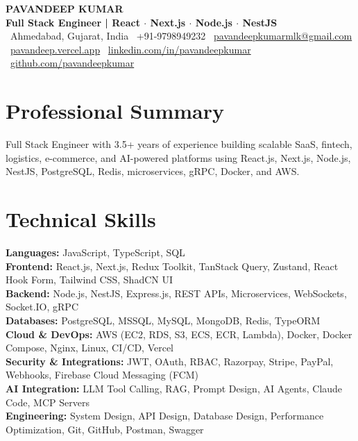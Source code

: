 \documentclass[letterpaper,10pt]{article}
\begin{document}

\begin{center}
    {\fontsize{22}{26}\selectfont\textbf{PAVANDEEP KUMAR}}\\[2pt]
    \textbf{Full Stack Engineer | React $\cdot$ Next.js $\cdot$ Node.js $\cdot$ NestJS}\\[2pt]

    \faMapMarker*\ Ahmedabad, Gujarat, India \quad
    \faPhone*\ +91-9798949232 \quad
    \faEnvelope\ \href{mailto:pavandeepkumarmlk@gmail.com}{pavandeepkumarmlk@gmail.com}\\[1pt]

    \faGlobe\ \href{https://pavandeep.vercel.app/}{pavandeep.vercel.app} \quad
    \faLinkedin\ \href{https://www.linkedin.com/in/pavandeepkumar/}{linkedin.com/in/pavandeepkumar} \quad
    \faGithub\ \href{https://github.com/pavandeepkumar}{github.com/pavandeepkumar}
\end{center}


\section{Professional Summary}

Full Stack Engineer with 3.5+ years of experience building scalable SaaS, fintech, logistics, e-commerce, and AI-powered platforms using React.js, Next.js, Node.js, NestJS, PostgreSQL, Redis, microservices, gRPC, Docker, and AWS.


\section{Technical Skills}

\textbf{Languages:} JavaScript, TypeScript, SQL\\[1pt]
\textbf{Frontend:} React.js, Next.js, Redux Toolkit, TanStack Query, Zustand, React Hook Form, Tailwind CSS, ShadCN UI\\[1pt]
\textbf{Backend:} Node.js, NestJS, Express.js, REST APIs, Microservices, WebSockets, Socket.IO, gRPC\\[1pt]
\textbf{Databases:} PostgreSQL, MSSQL, MySQL, MongoDB, Redis, TypeORM\\[1pt]
\textbf{Cloud \& DevOps:} AWS (EC2, RDS, S3, ECS, ECR, Lambda), Docker, Docker Compose, Nginx, Linux, CI/CD, Vercel\\[1pt]
\textbf{Security \& Integrations:} JWT, OAuth, RBAC, Razorpay, Stripe, PayPal, Webhooks, Firebase Cloud Messaging (FCM)\\[1pt]
\textbf{AI Integration:} LLM Tool Calling, RAG, Prompt Design, AI Agents, Claude Code, MCP Servers\\[1pt]
\textbf{Engineering:} System Design, API Design, Database Design, Performance Optimization, Git, GitHub, Postman, Swagger
\end{document}
